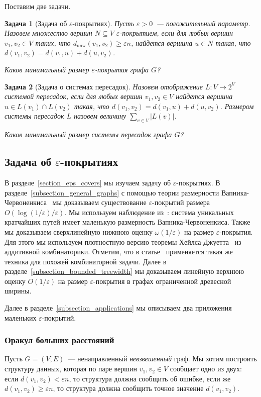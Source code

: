 \documentclass[12pt]{article}
\newcommand{\eps}{\varepsilon}
\newcommand{\dunw}{d_{\mathrm{unw}}}
\newcommand{\abs}[1]{\left|#1\right|}
\newtheorem{problem}{Задача}
\begin{document}
    Поставим две задачи.
    \begin{problem}[Задача об $\eps$-покрытиях]
        Пусть $\eps > 0$~--- положительный параметр. Назовем множество вершин $N \subseteq V$ \emph{$\eps$-покрытием},
        если для любых вершин $v_1, v_2 \in V$ таких, что $\dunw(v_1, v_2) \geq \eps n$, найдется вершина $u \in N$
        такая, что $d(v_1, v_2) = d(v_1, u) + d(u, v_2)$.

        Каков минимальный размер $\eps$-покрытия графа $G$?
    \end{problem}
    \begin{problem}[Задача о системах пересадок]
        Назовем отображение $L \colon V \to 2^V$ \emph{системой пересадок}, если для любых вершин $v_1, v_2 \in V$
        найдется вершина $u \in L(v_1) \cap L(v_2)$ такая, что $d(v_1, v_2) = d(v_1, u) + d(u, v_2)$.
        \emph{Размером} системы пересадок $L$ назовем величину $\sum_{v \in V} \abs{L(v)}$. 

        Каков минимальный размер системы пересадок графа $G$?
    \end{problem}
    \subsection{Задача об $\eps$-покрытиях}
    В разделе~\ref{section_eps_covers} мы изучаем задачу об $\eps$-покрытиях.
    В разделе~\ref{subsection_general_graphs} с помощью теории размерности Вапника-Червоненкиса~\cite{VC71}
    мы доказываем существование $\eps$-покрытий размера $O(\log(1 / \eps) / \eps)$.
    Мы используем наблюдение из~\cite{ADFGW11}: система уникальных кратчайших путей имеет маленькую размерность
    Вапника-Червоненкиса.
    Также мы доказываем сверхлинейную нижнюю оценку $\omega(1 / \eps)$ на размер $\eps$-покрытия.
    Для этого мы используем плотностную версию теоремы Хейлса-Джуетта~\cite{P09} из аддитивной комбинаторики.
    Отметим, что в статье~\cite{A10} применяется такая же техника для похожей комбинаторной задачи.
    Далее в разделе~\ref{subsection_bounded_treewidth} мы доказываем линейную верхнюю оценку $O(1 / \eps)$
    на размер $\eps$-покрытия в графах ограниченной древесной ширины.

    Далее в разделе~\ref{subsection_applications} мы описываем два приложения маленьких $\eps$-покрытий.
    \subsubsection{Оракул больших расстояний}
    Пусть $G = (V, E)$~--- ненаправленный \emph{невзвешенный} граф.
    Мы хотим построить структуру данных, которая по паре вершин $v_1, v_2 \in V$ сообщает одно из двух:
    если $d(v_1, v_2) < \eps n$, то структура должна сообщить об ошибке, если же $d(v_1, v_2) \geq \eps n$,
    то структура должна сообщить точное значение $d(v_1, v_2)$.
\end{document}
